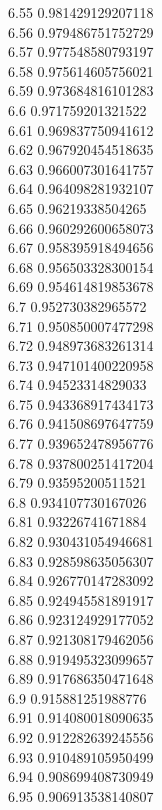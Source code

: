 {6.55	0.981429129207118\\
6.56	0.979486751752729\\
6.57	0.977548580793197\\
6.58	0.975614605756021\\
6.59	0.973684816101283\\
6.6	0.971759201321522\\
6.61	0.969837750941612\\
6.62	0.967920454518635\\
6.63	0.966007301641757\\
6.64	0.964098281932107\\
6.65	0.96219338504265\\
6.66	0.960292600658073\\
6.67	0.958395918494656\\
6.68	0.956503328300154\\
6.69	0.954614819853678\\
6.7	0.952730382965572\\
6.71	0.950850007477298\\
6.72	0.948973683261314\\
6.73	0.947101400220958\\
6.74	0.94523314829033\\
6.75	0.943368917434173\\
6.76	0.941508697647759\\
6.77	0.939652478956776\\
6.78	0.937800251417204\\
6.79	0.93595200511521\\
6.8	0.934107730167026\\
6.81	0.93226741671884\\
6.82	0.930431054946681\\
6.83	0.928598635056307\\
6.84	0.926770147283092\\
6.85	0.924945581891917\\
6.86	0.923124929177052\\
6.87	0.921308179462056\\
6.88	0.919495323099657\\
6.89	0.917686350471648\\
6.9	0.915881251988776\\
6.91	0.914080018090635\\
6.92	0.912282639245556\\
6.93	0.910489105950499\\
6.94	0.908699408730949\\
6.95	0.906913538140807\\
}
